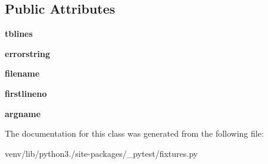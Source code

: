 \subsection*{Public Attributes}
\begin{DoxyCompactItemize}
\item 
\mbox{\label{class__pytest_1_1fixtures_1_1_fixture_lookup_error_repr_afa5d3df3ba7bef06b5b0a07ea0fb1927}} 
{\bfseries tblines}
\item 
\mbox{\label{class__pytest_1_1fixtures_1_1_fixture_lookup_error_repr_afb45806d173a44823c3641e484654a25}} 
{\bfseries errorstring}
\item 
\mbox{\label{class__pytest_1_1fixtures_1_1_fixture_lookup_error_repr_ab1a1448a7c33ceda63a887143c6b872a}} 
{\bfseries filename}
\item 
\mbox{\label{class__pytest_1_1fixtures_1_1_fixture_lookup_error_repr_acb3a6cd1e0bc310710c4e8428d5f4fc4}} 
{\bfseries firstlineno}
\item 
\mbox{\label{class__pytest_1_1fixtures_1_1_fixture_lookup_error_repr_af5914b43c11606aa691a466cda30f53c}} 
{\bfseries argname}
\end{DoxyCompactItemize}


The documentation for this class was generated from the following file\+:\begin{DoxyCompactItemize}
\item 
venv/lib/python3./site-\/packages/\+\_\+pytest/fixtures.\+py\end{DoxyCompactItemize}
